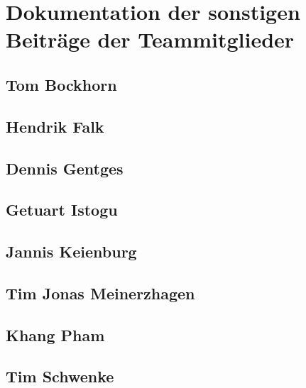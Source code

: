 \section{Dokumentation der sonstigen Beiträge der Teammitglieder}

\subsection{Tom Bockhorn}

\subsection{Hendrik Falk}

\subsection{Dennis Gentges}

\subsection{Getuart Istogu}

\subsection{Jannis Keienburg}

\subsection{Tim Jonas Meinerzhagen}

\subsection{Khang Pham}

\subsection{Tim Schwenke}
